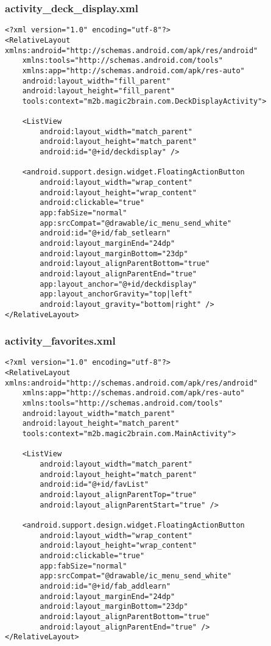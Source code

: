 \subsubsection{activity\_deck\_display.xml}
\begin{lstlisting}
<?xml version="1.0" encoding="utf-8"?>
<RelativeLayout xmlns:android="http://schemas.android.com/apk/res/android"
    xmlns:tools="http://schemas.android.com/tools"
    xmlns:app="http://schemas.android.com/apk/res-auto"
    android:layout_width="fill_parent"
    android:layout_height="fill_parent"
    tools:context="m2b.magic2brain.com.DeckDisplayActivity">

    <ListView
        android:layout_width="match_parent"
        android:layout_height="match_parent"
        android:id="@+id/deckdisplay" />

    <android.support.design.widget.FloatingActionButton
        android:layout_width="wrap_content"
        android:layout_height="wrap_content"
        android:clickable="true"
        app:fabSize="normal"
        app:srcCompat="@drawable/ic_menu_send_white"
        android:id="@+id/fab_setlearn"
        android:layout_marginEnd="24dp"
        android:layout_marginBottom="23dp"
        android:layout_alignParentBottom="true"
        android:layout_alignParentEnd="true"
        app:layout_anchor="@+id/deckdisplay"
        app:layout_anchorGravity="top|left"
        android:layout_gravity="bottom|right" />
</RelativeLayout>
\end{lstlisting}

\subsubsection{activity\_favorites.xml}
\begin{lstlisting}
<?xml version="1.0" encoding="utf-8"?>
<RelativeLayout xmlns:android="http://schemas.android.com/apk/res/android"
    xmlns:app="http://schemas.android.com/apk/res-auto"
    xmlns:tools="http://schemas.android.com/tools"
    android:layout_width="match_parent"
    android:layout_height="match_parent"
    tools:context="m2b.magic2brain.com.MainActivity">

    <ListView
        android:layout_width="match_parent"
        android:layout_height="match_parent"
        android:id="@+id/favList"
        android:layout_alignParentTop="true"
        android:layout_alignParentStart="true" />

    <android.support.design.widget.FloatingActionButton
        android:layout_width="wrap_content"
        android:layout_height="wrap_content"
        android:clickable="true"
        app:fabSize="normal"
        app:srcCompat="@drawable/ic_menu_send_white"
        android:id="@+id/fab_addlearn"
        android:layout_marginEnd="24dp"
        android:layout_marginBottom="23dp"
        android:layout_alignParentBottom="true"
        android:layout_alignParentEnd="true" />
</RelativeLayout>
\end{lstlisting}

